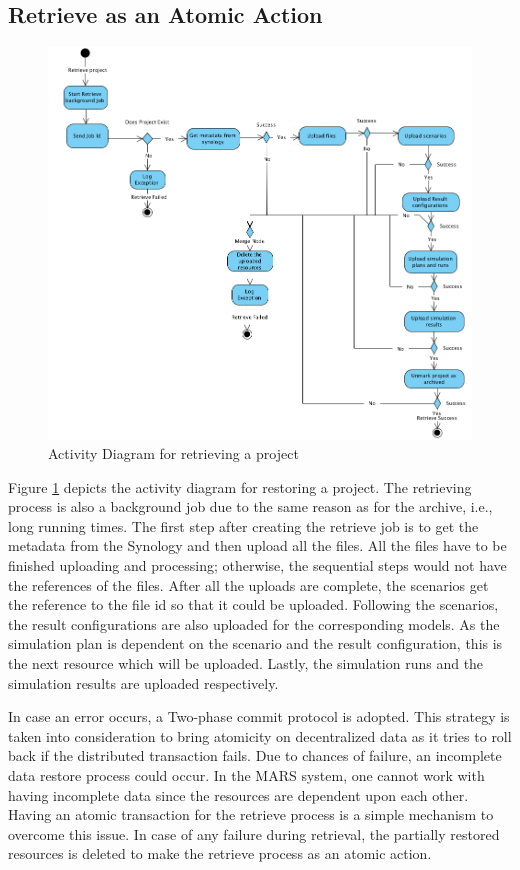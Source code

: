\subsection{Retrieve as an Atomic Action}
\begin{figure}[H]
    \centering \includegraphics[scale=0.45]{grafiken/restoreActivity.png}
    \caption{Activity Diagram for retrieving a project}
    \label{fig:activityRestore}
\end{figure}

Figure \ref{fig:activityRestore} depicts the activity diagram for restoring a project. The retrieving process is also a background job due to the same reason
as for the archive, i.e., long running times. The first step after creating the retrieve job is to get the metadata from the Synology and then upload all the files.
All the files have to be finished uploading and processing; otherwise, the sequential steps would not have the references of the files. After all the uploads are complete,
the scenarios get the reference to the file id so that it could be uploaded. Following the scenarios, the result configurations are also uploaded for the corresponding models.
As the simulation plan is dependent on the scenario and the result configuration, this is the next resource which will be uploaded. Lastly, the simulation runs
and the simulation results are uploaded respectively. 

In case an error occurs, a Two-phase commit protocol \cite{atomic} is adopted. This strategy is taken into consideration to bring atomicity on decentralized data
as it tries to roll back if the distributed transaction fails.
Due to chances of failure, an incomplete data restore process could occur. In the MARS system, one cannot work with having
incomplete data since the resources are dependent upon each other. Having an atomic transaction for the retrieve process is a simple mechanism to overcome
this issue. In case of any failure during retrieval, the partially restored resources is deleted to make the retrieve process as an atomic action.

